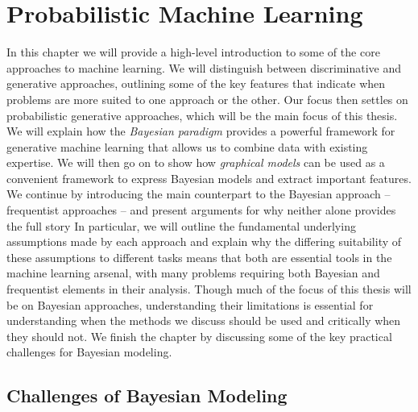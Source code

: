 %
%	


\chapter{Probabilistic Machine Learning}
\label{chp:bayes}

In this chapter we will provide a high-level introduction to  some of the core approaches to
machine learning.  We will distinguish between discriminative and generative approaches,
outlining some of the key features that indicate when problems are more suited to one approach
or the other.  Our focus then settles on probabilistic generative approaches, which
will be the main focus of this thesis.  We will explain how the \emph{Bayesian paradigm} provides
a powerful framework for generative machine learning that allows us to combine data with existing
expertise.  We will then go on to show how \emph{graphical models} can be used as a convenient
framework to express Bayesian models and extract important features.  
We continue by introducing the main counterpart to the Bayesian approach -- frequentist
approaches -- and present arguments for why neither alone provides the full story
In particular, we will outline the fundamental underlying
assumptions made by each approach and explain why the differing suitability of these
assumptions to different tasks means that both are  essential tools in the machine learning
arsenal, with many problems requiring both Bayesian and frequentist elements in their analysis.
Though much of the focus of this thesis will be on Bayesian approaches, understanding their limitations
is essential for understanding when the methods we discuss should be used and critically when they
should not.  We finish the chapter by discussing some of the key practical challenges for Bayesian modeling.







\section{Challenges of Bayesian Modeling}
\label{sec:bayes:challenges}

